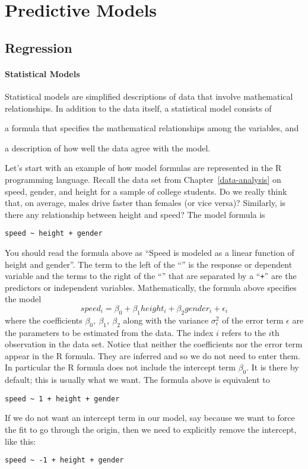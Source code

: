 \chapter{Predictive Models}

\section{Regression}

\subsubsection*{Statistical Models}

Statistical models are simplified descriptions of data that involve
mathematical relationships. In addition to the data itself,
a statistical model consists of \begin{inparaenum}[1)] \item a formula
  that specifies the mathematical relationships among the variables,
  and \item a description of how well the data agree with the model.
  \end{inparaenum} 
  Let's start with an example of how model formulas are represented in
  the R programming language. Recall the data set from
  Chapter~\ref{data-analysis} on speed, gender, and height for a
  sample of college students. Do we really think that, on average,
  males drive faster than females (or vice versa)? Similarly, is there
  any relationship between height and speed? The model formula is
\begin{Verbatim}
speed ~ height + gender
\end{Verbatim}
You should read the
formula above as ``Speed is modeled as a linear function of height and gender''.
The term to the left of the ``\mtilde'' is the
response or dependent variable and the terms to the right of the ``\mtilde''
that are separated by a ``\texttt{+}'' are the predictors or independent variables.
Mathematically, the formula
above specifies the model
\[
  speed_i = \beta_0 + \beta_1 height_i + \beta_2 gender_i + \epsilon_i
\]
where the coefficients $\beta_0,~\beta_1,~\beta_2$  along with the variance $\sigma_{\epsilon}^2$ of
the error term $\epsilon$ are the parameters to be estimated from the data.
The index $i$ refers to the $i$th observation in the data set.
Notice that neither the coefficients nor the error term appear in the R formula.
They are inferred and so we do not need to enter them. In particular
the R formula does not include the intercept term $\beta_0$. It is there
by default; this is usually what we want. The formula above is equivalent to
\begin{Verbatim}
speed ~ 1 + height + gender
\end{Verbatim}
If we do not want an intercept term in our model, say because we want to
force the fit to go through the origin, then we need to explicitly remove
the intercept, like this:
\begin{Verbatim}
speed ~ -1 + height + gender
\end{Verbatim}

